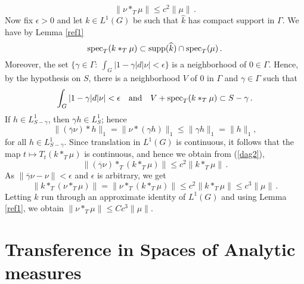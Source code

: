 \documentclass[12pt]{article}
\newcommand{\spec}{{\rm spec}}
\begin{document}
\begin{equation}
\|\nu*_T\mu\|\leq c^2 \|\mu\|\,.
\label{dag2}
\end{equation}
Now fix $\epsilon>0$ and let $k\in L^1(G)$ be such that
$\widehat{k}$ has compact support in $\Gamma$.  
We have by Lemma \ref{ref1}
$$\spec_T (k*_T \mu)\subset \mbox{supp}(\widehat{k}) \cap \spec_T(\mu)\,.$$
Moreover, the set 
$\{\gamma\in\Gamma:\ \int_G|1-\gamma|d|\nu|<\epsilon\}$
is a neighborhood of $0\in\Gamma$.  Hence, by the hypothesis on $S$,
there is a neighborhood $V$ of 0 in $\Gamma$  and $\gamma\in\Gamma$ such that
$$\int_G|1-\gamma|d|\nu|<\epsilon\quad 
\mbox{and}\quad V+\spec_T(k*_T\mu)\subset S-\gamma\,.$$
If $h\in L^1_{S-\gamma}$, then $\gamma h\in L^1_S$; hence
$$\|(\overline{\gamma}\nu)*h\|_1=\|\nu*(\gamma h)\|_1\leq \|\gamma h\|_1=\|h\|_1, $$
for all $h\in L^1_{S-\gamma}$.
Since translation in $L^1(G)$ is continuous, it follows that 
the map $t\mapsto T_t(k*_T\mu)$ is continuous, and hence we obtain
from (\ref{dag2}),
$$\|(\overline{\gamma}\nu)*_T(k*_T\mu)\|\leq c^2\|k*_T\mu\|\,.$$
As $\|\overline{\gamma}\nu-\nu\|<\epsilon$ and $\epsilon$ is arbitrary, we 
get
$$\|k*_T(\nu*_T\mu)\|=\|\nu*_T(k*_T\mu)\|\leq c^2\|k*_T\mu\|\leq c^3\|\mu\|\,.$$
Letting $k$ run through an approximate identity of $L^1(G)$ and using 
Lemma \ref{ref1}, we obtain $\| \nu*_T\mu \|\leq Cc^3\|\mu\|$.










\section{Transference in Spaces of Analytic measures}
\end{document}
